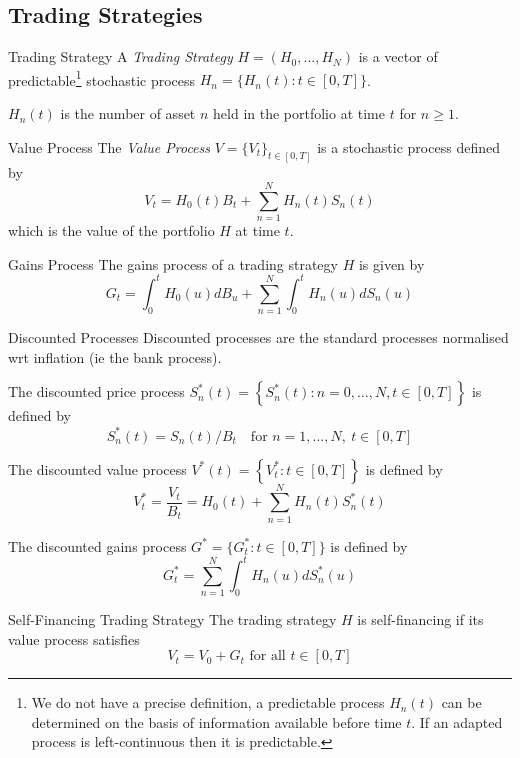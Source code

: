 \documentclass[11pt,a4paper]{article}
\begin{document}
\subsection{Trading Strategies}

  \begin{definition}{Trading Strategy}
    A \textit{Trading Strategy} $H=(H_0,\dots,H_N)$ is a vector of predictable\footnote{We do not have a precise definition, a predictable process $H_n(t)$ can be determined on the basis of information available before time $t$. If an adapted process is left-continuous then it is predictable.} stochastic process $H_n=\{H_n(t):t\in[0,T]\}$.
    \par $H_n(t)$ is the number of asset $n$ held in the portfolio at time $t$ for $n\geq1$.
  \end{definition}

  \begin{definition}{Value Process}
    The \textit{Value Process} $V=\{V_t\}_{t\in[0,T]}$ is a stochastic process defined by
    \[ V_t=H_0(t)B_t+\sum_{n=1}^NH_n(t)S_n(t) \]
    which is the value of the portfolio $H$ at time $t$.
  \end{definition}

  \begin{definition}{Gains Process}
    The gains process of a trading strategy $H$ is given by
    \[ G_t=\int_0^tH_0(u)dB_u+\sum_{n=1}^N\int_0^tH_n(u)dS_n(u) \]
  \end{definition}

  \begin{definition}{Discounted Processes}
    Discounted processes are the standard processes normalised wrt inflation (ie the bank process).
    \par The discounted price process $S_n^*(t)=\left\{S_n^*(t):n=0,\dots,N,t\in[0,T]\right\}$ is defined by
    \[ S_n^*(t)=S_n(t)/B_t\quad\text{for }n=1,\dots,N,\ t\in[0,T] \]
    \par The discounted value process $V^*(t)=\left\{V_t^*:t\in[0,T]\right\}$ is defined by
    \[ V_t^*=\frac{V_t}{B_t}=H_0(t)+\sum_{n=1}^NH_n(t)S_n^*(t) \]
    \par The discounted gains process $G^*=\{G_t^*:t\in[0,T]\}$ is defined by
    \[ G_t^*=\sum_{n=1}^N\int_0^tH_n(u)dS_n^*(u) \]
  \end{definition}

  \begin{definition}{Self-Financing Trading Strategy}
    The trading strategy $H$ is self-financing if its value process satisfies
    \[ V_t=V_0+G_t\text{ for all }t\in[0,T] \]
  \end{definition}
\end{document}
